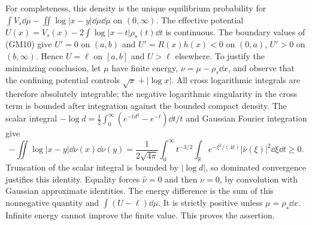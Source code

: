 \documentclass[11pt]{article}
\newcommand{\R}{\mathbb R}\newcommand{\C}{\mathbb C}
\begin{document}
For completeness, this density is the unique equilibrium probability
for $\int V_s\dd\mu-\iint\log|x-y|\dd\mu\dd\mu$ on $(0,\infty)$.
The effective potential
$U(x)=V_s(x)-2\int\log|x-t|\rho_s(t)\dd t$ is continuous.
The boundary values of (GM10) give $U'=0$ on $(a,b)$ and
$U'=R(x)h(x)<0$ on $(0,a)$, $U'>0$ on $(b,\infty)$.
Hence $U=\ell$ on $[a,b]$ and $U>\ell$ elsewhere.
To justify the minimizing conclusion, let $\mu$ have finite energy,
$\nu=\mu-\rho_s\dd x$, and observe that the confining potential
controls $\sqrt x+|\log x|$. All cross logarithmic integrals are therefore
absolutely integrable; the negative logarithmic singularity in the cross
term is bounded after integration against the bounded compact density.
The scalar integral
$-\log d=\tfrac12\int_0^\infty(e^{-td^2}-e^{-t})\dd t/t$
and Gaussian Fourier integration give
\[
 -\iint\log|x-y|\dd\nu(x)\dd\nu(y)
 =\frac1{2\sqrt{4\pi}}\int_0^\infty t^{-3/2}
       \int_\R e^{-\xi^2/(4t)}|\widehat\nu(\xi)|^2\dd\xi\dd t\ge0.
\]
Truncation of the scalar integral is bounded by $|\log d|$, so dominated
convergence justifies this identity. Equality forces $\widehat\nu=0$ and
then $\nu=0$, by convolution with Gaussian approximate identities.
The energy difference is the sum of this nonnegative quantity and
$\int(U-\ell)\dd\mu$. It is strictly positive unless $\mu=\rho_s\dd x$.
Infinite energy cannot improve the finite value. This proves the assertion.
\end{document}
